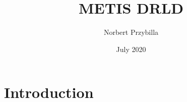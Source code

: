 \documentclass{article}
\title{METIS DRLD}
\author{Norbert Przybilla}
\date{July 2020}
\begin{document}
\maketitle

\section{Introduction}
\end{document}
